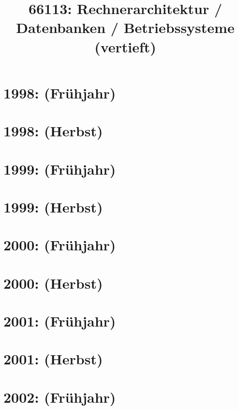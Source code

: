 \documentclass{lehramt-informatik-haupt}
\title{66113: Rechnerarchitektur / Datenbanken / Betriebssysteme (vertieft)}
\begin{document}
\maketitle
\tableofcontents

\section{1998: (Frühjahr)}


\section{1998: (Herbst)}


\section{1999: (Frühjahr)}


\section{1999: (Herbst)}


\section{2000: (Frühjahr)}


\section{2000: (Herbst)}


\section{2001: (Frühjahr)}


\section{2001: (Herbst)}


\section{2002: (Frühjahr)}

\end{document}
